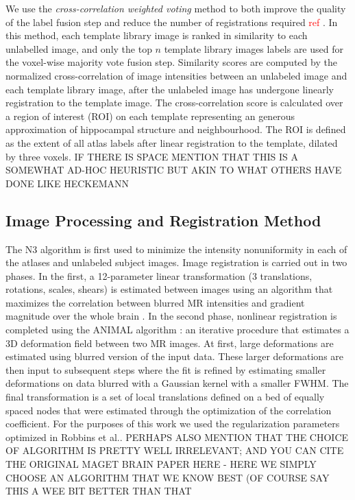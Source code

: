 \documentclass{article}
\newcommand{\todo}[1]{
    \textcolor{red}{#1}
}
\begin{document}
We use the {\it cross-correlation weighted voting} method to both improve the
quality of the label fusion step and reduce the number of registrations
required \todo{ref}.  In this method, each template library image is ranked 
in similarity to each unlabelled image, and only the top $n$ template library
images labels are used for the voxel-wise majority vote fusion step.
Similarity scores are computed by the normalized cross-correlation of image
intensities between an unlabeled image and each template library image, after
the unlabeled image has undergone linearly registration to the template image.
The cross-correlation score is calculated over a region of interest (ROI) on
each template representing an generous approximation of hippocampal structure
and neighbourhood.  The ROI is defined as the extent of all atlas labels after
linear registration to the template, dilated by three voxels. {IF THERE IS SPACE MENTION THAT THIS IS A SOMEWHAT AD-HOC HEURISTIC BUT AKIN TO WHAT OTHERS HAVE DONE LIKE HECKEMANN}


\subsection{Image Processing and Registration Method}
The N3 algorithm \cite{Sled1998} is first used to minimize the intensity
nonuniformity in each of the atlases and unlabeled subject images.  Image
registration is carried out in two phases.  In the first, a 12-parameter linear
transformation (3 translations, rotations, scales, shears) is estimated between
images using an algorithm that maximizes the correlation between blurred MR
intensities and gradient magnitude over the whole brain \cite{Collins}.  In the
second phase, nonlinear registration is completed using the ANIMAL algorithm
\cite{Collins1995}: an iterative procedure that estimates a 3D deformation
field between two MR images. At first, large deformations are estimated using
blurred version of the input data. These larger deformations are then input to
subsequent steps where the fit is refined by estimating smaller deformations on
data blurred with a Gaussian kernel with a smaller FWHM. The final
transformation is a set of local translations defined on a bed of equally
spaced nodes that were estimated through the optimization of the correlation
coefficient. For the purposes of this work we used the regularization
parameters optimized in Robbins et al.\cite{Robbins2004}. {PERHAPS ALSO MENTION THAT THE CHOICE OF ALGORITHM IS PRETTY WELL IRRELEVANT; AND YOU CAN CITE THE ORIGINAL MAGET BRAIN PAPER HERE - HERE WE SIMPLY CHOOSE AN ALGORITHM THAT WE KNOW BEST (OF COURSE SAY THIS A WEE BIT BETTER THAN THAT}
\end{document}
